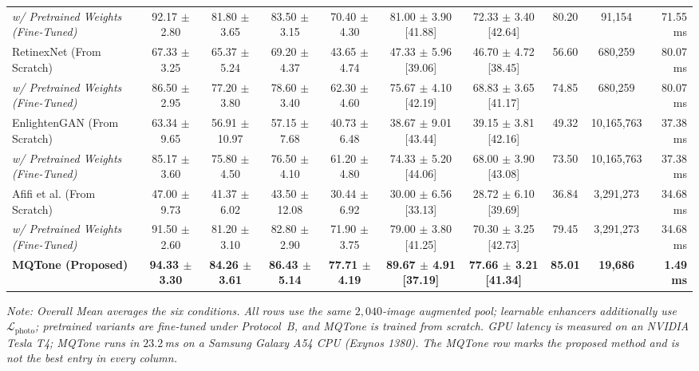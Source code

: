 \documentclass[final,5p,times,twocolumn,authoryear]{elsarticle}
\begin{document}
\begin{table}[t]
{\begin{tabular}{lccccccccr}
\quad \textit{w/ Pretrained Weights (Fine-Tuned)} & 92.17 $\pm$ 2.80 & 81.80 $\pm$ 3.65 & 83.50 $\pm$ 3.15 & 70.40 $\pm$ 4.30 & 81.00 $\pm$ 3.90 \scriptsize{[41.88]} & 72.33 $\pm$ 3.40 \scriptsize{[42.64]} & 80.20 & 91,154 & 71.55 ms \\
RetinexNet (From Scratch) \cite{Wei2018} & 67.33 $\pm$ 3.25 & 65.37 $\pm$ 5.24 & 69.20 $\pm$ 4.37 & 43.65 $\pm$ 4.74 & 47.33 $\pm$ 5.96 \scriptsize{[39.06]} & 46.70 $\pm$ 4.72 \scriptsize{[38.45]} & 56.60 & 680,259 & 80.07 ms \\
\quad \textit{w/ Pretrained Weights (Fine-Tuned)} & 86.50 $\pm$ 2.95 & 77.20 $\pm$ 3.80 & 78.60 $\pm$ 3.40 & 62.30 $\pm$ 4.60 & 75.67 $\pm$ 4.10 \scriptsize{[42.19]} & 68.83 $\pm$ 3.65 \scriptsize{[41.17]} & 74.85 & 680,259 & 80.07 ms \\
EnlightenGAN (From Scratch) \cite{Jiang2021} & 63.34 $\pm$ 9.65 & 56.91 $\pm$ 10.97 & 57.15 $\pm$ 7.68 & 40.73 $\pm$ 6.48 & 38.67 $\pm$ 9.01 \scriptsize{[43.44]} & 39.15 $\pm$ 3.81 \scriptsize{[42.16]} & 49.32 & 10,165,763 & 37.38 ms \\
\quad \textit{w/ Pretrained Weights (Fine-Tuned)} & 85.17 $\pm$ 3.60 & 75.80 $\pm$ 4.50 & 76.50 $\pm$ 4.10 & 61.20 $\pm$ 4.80 & 74.33 $\pm$ 5.20 \scriptsize{[44.06]} & 68.00 $\pm$ 3.90 \scriptsize{[43.08]} & 73.50 & 10,165,763 & 37.38 ms \\
Afifi et al. (From Scratch) \cite{Afifi2021} & 47.00 $\pm$ 9.73 & 41.37 $\pm$ 6.02 & 43.50 $\pm$ 12.08 & 30.44 $\pm$ 6.92 & 30.00 $\pm$ 6.56 \scriptsize{[33.13]} & 28.72 $\pm$ 6.10 \scriptsize{[39.69]} & 36.84 & 3,291,273 & 34.68 ms \\
\quad \textit{w/ Pretrained Weights (Fine-Tuned)} & 91.50 $\pm$ 2.60 & 81.20 $\pm$ 3.10 & 82.80 $\pm$ 2.90 & 71.90 $\pm$ 3.75 & 79.00 $\pm$ 3.80 \scriptsize{[41.25]} & 70.30 $\pm$ 3.25 \scriptsize{[42.73]} & 79.45 & 3,291,273 & 34.68 ms \\
\midrule
\textbf{MQTone (Proposed)} & \textbf{94.33 $\pm$ 3.30} & \textbf{84.26 $\pm$ 3.61} & \textbf{86.43 $\pm$ 5.14} & \textbf{77.71 $\pm$ 4.19} & \textbf{89.67 $\pm$ 4.91 \scriptsize{[37.19]}} & \textbf{77.66 $\pm$ 3.21 \scriptsize{[41.34]}} & \textbf{85.01} & \textbf{19,686} & \textbf{1.49 ms} \\
\bottomrule
\end{tabular}%
}
{\footnotesize \raggedright \textit{Note: Overall Mean averages the six conditions. All rows use the same $2{,}040$-image augmented pool; learnable enhancers additionally use $\mathcal{L}_{\text{photo}}$; pretrained variants are fine-tuned under Protocol~B, and MQTone is trained from scratch. GPU latency is measured on an NVIDIA Tesla T4; MQTone runs in $23.2$\,ms on a Samsung Galaxy A54 CPU (Exynos 1380). The MQTone row marks the proposed method and is not the best entry in every column.}\par}
\end{table}
\end{document}
